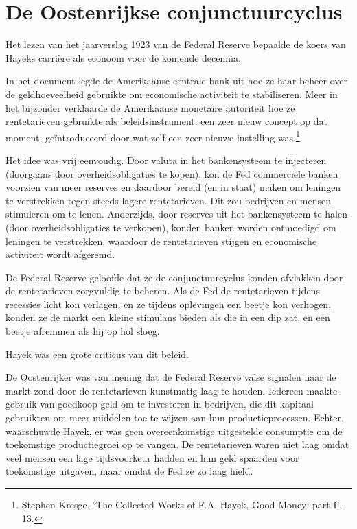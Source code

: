 \documentclass[smalldemyvopaper,11pt,twoside,onecolumn,openright,extrafontsizes,hidelinks]{memoir}
\begin{document}
\section{De Oostenrijkse
conjunctuurcyclus}\label{de-oostenrijkse-conjunctuurcyclus}

Het lezen van het jaarverslag 1923 van de Federal Reserve bepaalde de
koers van Hayeks carrière als econoom voor de komende decennia.

In het document legde de Amerikaanse centrale bank uit hoe ze haar
beheer over de geldhoeveelheid gebruikte om economische activiteit te
stabiliseren. Meer in het bijzonder verklaarde de Amerikaanse monetaire
autoriteit hoe ze rentetarieven gebruikte als beleidsinstrument: een
zeer nieuw concept op dat moment, geïntroduceerd door wat zelf een zeer
nieuwe instelling was.\footnote{Stephen Kresge, `The Collected Works of
  F.A. Hayek, Good Money: part I', 13.}

Het idee was vrij eenvoudig. Door valuta in het bankensysteem te
injecteren (doorgaans door overheidsobligaties te kopen), kon de Fed
commerciële banken voorzien van meer reserves en daardoor bereid (en in
staat) maken om leningen te verstrekken tegen steeds lagere
rentetarieven. Dit zou bedrijven en mensen stimuleren om te lenen.
Anderzijds, door reserves uit het bankensysteem te halen (door
overheidsobligaties te verkopen), konden banken worden ontmoedigd om
leningen te verstrekken, waardoor de rentetarieven stijgen en
economische activiteit wordt afgeremd.

De Federal Reserve geloofde dat ze de conjunctuurcyclus konden afvlakken
door de rentetarieven zorgvuldig te beheren. Als de Fed de rentetarieven
tijdens recessies licht kon verlagen, en ze tijdens oplevingen een
beetje kon verhogen, konden ze de markt een kleine stimulans bieden als
die in een dip zat, en een beetje afremmen als hij op hol sloeg.

Hayek was een grote criticus van dit beleid.

De Oostenrijker was van mening dat de Federal Reserve valse signalen
naar de markt zond door de rentetarieven kunstmatig laag te houden.
Iedereen maakte gebruik van goedkoop geld om te investeren in bedrijven,
die dit kapitaal gebruikten om meer middelen toe te wijzen aan hun
productieprocessen. Echter, waarschuwde Hayek, er was geen
overeenkomstige uitgestelde consumptie om de toekomstige productiegroei
op te vangen. De rentetarieven waren niet laag omdat veel mensen een
lage tijdsvoorkeur hadden en hun geld spaarden voor toekomstige
uitgaven, maar omdat de Fed ze zo laag hield.
\end{document}
